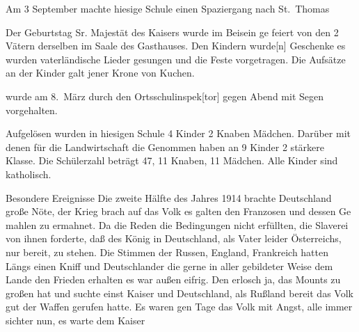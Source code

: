 

\pstart
Am 3 September machte hiesige Schule einen Spaziergang nach St.\ Thomas

\pend
{}
\pstart


\pend
{}
\pstart

Der Geburtstag Sr. Majestät des Kaisers wurde im Beisein ge\ohb
feiert von den 2 Vätern derselben im Saale des Gasthauses. Den\ob
Kindern wurde{[n]} Geschenke\unsicher{} es wurden vaterländische Lieder gesungen\ob
und die Feste vorgetragen. Die Aufsätze an der Kinder galt\ob
jener Krone von Kuchen.

\pend
{}
\pstart

wurde am 8.\ März durch den Ortsschulinspek{[tor]} gegen Abend\unsicher\ob
mit Segen vorgehalten.

\pend
{}
\pstart

Aufgelösen wurden in hiesigen Schule 4 Kinder 2 Knaben Mädchen. Darüber mit denen für die Landwirtschaft\ob
die Genommen haben an 9 Kinder 2 stärkere Klasse.\ob
Die Schülerzahl beträgt 47, 11 Knaben, 11 Mädchen.\ob
Alle Kinder sind katholisch.


Besondere Ereignisse\ob
Die zweite Hälfte des Jahres 1914 brachte Deutschland große Nöte, der\ob
Krieg brach auf das Volk es galten den Franzosen und dessen\unsicher{} Ge\ohb
mahlen zu ermahnet. Da die Reden die Bedingungen nicht erfüllten, die\ob
Slaverei von ihnen forderte, daß des König in Deutschland, als Vater\ob
leider Österreichs, nur bereit, zu stehen. Die Stimmen der Russen,\ob
England, Frankreich hatten Längs einen Kniff und Deutschlander\ob
die gerne in aller gebildeter Weise dem Lande den Frieden erhalten\ob
es war außen eifrig. Den erlosch ja, das Mounts zu großen hat\ob
und suchte einst Kaiser und Deutschland, als Rußland bereit das\ob
Volk gut der Waffen gerufen hatte. Es waren gen Tage das\ob
Volk mit Angst, alle immer sichter nun, es warte dem Kaiser
\pend
